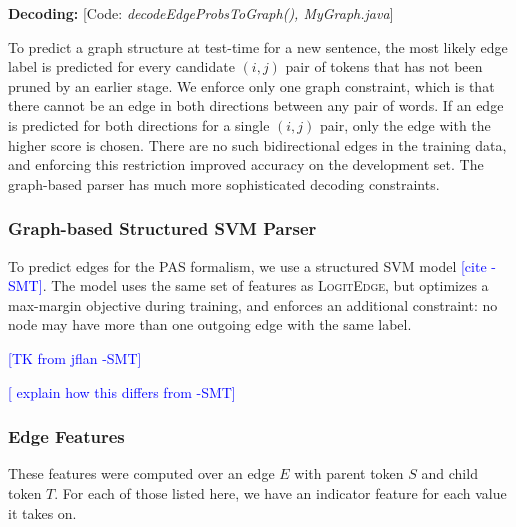\documentclass[11pt]{article}
\newcommand{\bocomment}[1]{\textcolor{Bittersweet}{[#1 -BTO]}}
\newcommand{\sam}[1]{\textcolor{blue}{[#1 -SMT]}}
\newcommand{\codenote}[1]{\textcolor{PineGreen}{[Code: \emph{#1}]}}
\newcommand{\logitedge}{\textsc{LogitEdge}}
\newcommand{\noedge}{\textsc{NoEdge}}
\begin{document}


\textbf{Decoding:}
\codenote{decodeEdgeProbsToGraph(), MyGraph.java}

To predict a graph structure at test-time for a new sentence,
the most likely edge label is predicted for every candidate $(i, j)$ pair of
tokens that has not been pruned by an earlier stage.
We enforce only one graph constraint, which is that there cannot be
an edge in both directions between any pair of words.
If an edge is predicted for both directions for a single $(i, j)$
pair, only the edge with the higher score is chosen.
There are no such bidirectional edges in the training data, and enforcing this
restriction improved accuracy on the development set.
The graph-based parser has much more sophisticated decoding constraints.



\subsubsection{Graph-based Structured SVM Parser} \label{s:graphparser}

To predict edges for the PAS formalism, we use a structured SVM model
\sam{cite}.
The model uses the same set of features as \logitedge, but optimizes a
max-margin objective during training, and enforces an additional constraint: no
node may have more than one outgoing edge with the same label.

\sam{TK from jflan}

\sam{
explain how this differs from 
\cite{flanigan-etal:ACL2014}
}



\subsubsection{Edge Features}
\label{s:edgefeatures}

\label{s:features}
These features were computed over an edge $E$ with parent token $S$ and child
token $T$.  For each of those listed here, we have an indicator feature for each value it takes on.
\end{document}

